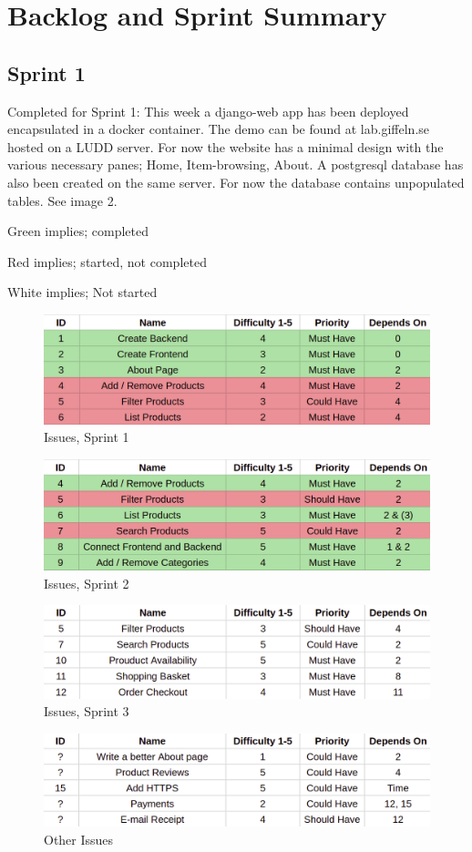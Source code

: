 \newpage

\section{Backlog and Sprint Summary}

\subsection{Sprint 1}
Completed for Sprint 1: This week a django-web app has been deployed
encapsulated in a docker container. The demo can be found at lab.giffeln.se
hosted on a LUDD server. For now the website has a minimal design with the
various necessary panes; Home, Item-browsing, About. A postgresql database
has also been created on the same server. For now the database contains
unpopulated tables. See image 2.

Green implies; completed

Red implies; started, not completed 

White implies; Not started

\begin{figure}[H]
\centering
\includegraphics[width=\textwidth]{second_sprint/sprint_1.png}
\caption{\label{fig:sprint_1} Issues, Sprint 1}
\end{figure}

\begin{figure}[H]
\centering
\includegraphics[width=\textwidth]{second_sprint/sprint_2.png}
\caption{\label{fig:sprint_2} Issues, Sprint 2}
\end{figure}

\begin{figure}[H]
\centering
\includegraphics[width=\textwidth]{second_sprint/sprint_3.png}
\caption{\label{fig:sprint_3} Issues, Sprint 3}
\end{figure}

\begin{figure}[H]
\centering
\includegraphics[width=\textwidth]{second_sprint/other.png}
\caption{\label{fig:sprint_4} Other Issues}
\end{figure}
